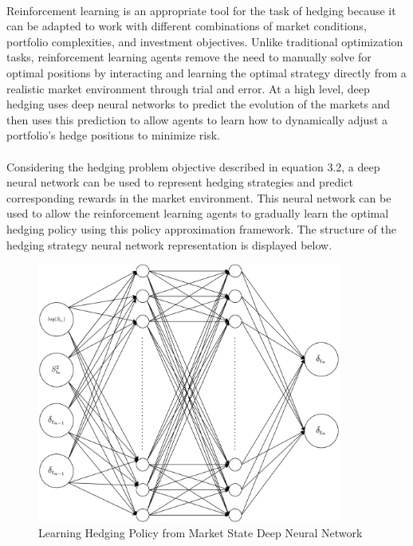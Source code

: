 \\
Reinforcement learning is an appropriate tool for the task of hedging because it can be adapted to work with different combinations of market conditions, portfolio complexities, and investment objectives. Unlike traditional optimization tasks, reinforcement learning agents remove the need to manually solve for optimal positions by interacting and learning the optimal strategy directly from a realistic market environment through trial and error. At a high level, deep hedging uses deep neural networks to predict the evolution of the markets and then uses this prediction to allow agents to learn how to dynamically adjust a portfolio's hedge positions to minimize risk.
\\ \\
Considering the hedging problem objective described in equation 3.2, a deep neural network can be used to represent hedging strategies and predict corresponding rewards in the market environment. This neural network can be used to allow the reinforcement learning agents to gradually learn the optimal hedging policy using this policy approximation framework. The structure of the hedging strategy neural network representation is displayed below.
\begin{figure}[h]
\centering
\includegraphics[width=10cm]{templates/assets/drl/dnn.png}
\caption{Learning Hedging Policy from Market State Deep Neural Network}
\end{figure}

